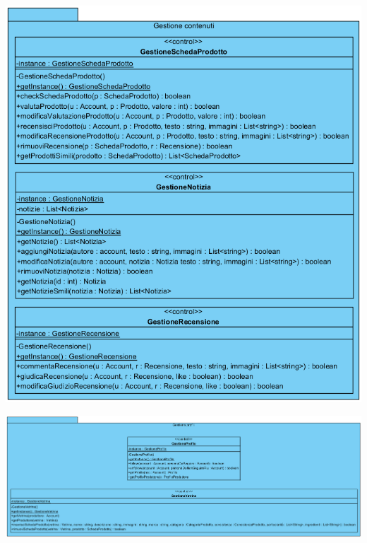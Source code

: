 \begin{center}
			\includegraphics[width=\textwidth]{assets/visualParadigm/classi/GestioneContenuti}
\end{center}

\begin{landscape}
\begin{center}
			\includegraphics[width=\linewidth]{assets/visualParadigm/classi/GestioneProfili}
\end{center}
\end{landscape}

